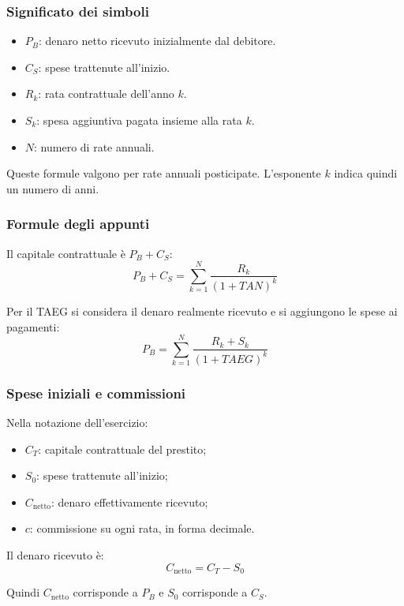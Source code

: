 \subsubsection*{Significato dei simboli}

\begin{itemize}
    \item $P_B$: denaro netto ricevuto inizialmente dal debitore.
    \item $C_S$: spese trattenute all'inizio.
    \item $R_k$: rata contrattuale dell'anno $k$.
    \item $S_k$: spesa aggiuntiva pagata insieme alla rata $k$.
    \item $N$: numero di rate annuali.
\end{itemize}

\noindent
Queste formule valgono per rate annuali posticipate.
L'esponente $k$ indica quindi un numero di anni.

\subsubsection*{Formule degli appunti}

\noindent
Il capitale contrattuale è $P_B+C_S$:
\[
    P_B+C_S
    =
    \sum_{k=1}^{N}\frac{R_k}{(1+TAN)^k}
\]

\noindent
Per il TAEG si considera il denaro realmente ricevuto
e si aggiungono le spese ai pagamenti:
\[
    P_B
    =
    \sum_{k=1}^{N}\frac{R_k+S_k}{(1+TAEG)^k}
\]

\subsubsection*{Spese iniziali e commissioni}

\noindent
Nella notazione dell'esercizio:
\begin{itemize}
    \item $C_T$: capitale contrattuale del prestito;
    \item $S_0$: spese trattenute all'inizio;
    \item $C_{\text{netto}}$: denaro effettivamente ricevuto;
    \item $c$: commissione su ogni rata, in forma decimale.
\end{itemize}

\noindent
Il denaro ricevuto è:
\[
    C_{\text{netto}}=C_T-S_0
\]

\noindent
Quindi $C_{\text{netto}}$ corrisponde a $P_B$
e $S_0$ corrisponde a $C_S$.

